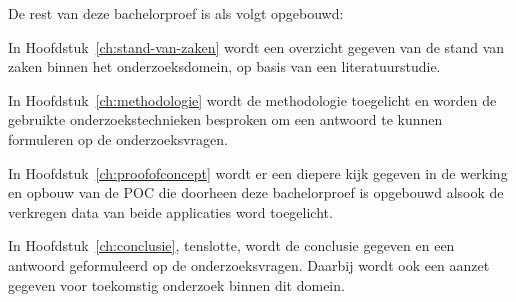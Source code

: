 
De rest van deze bachelorproef is als volgt opgebouwd:

In Hoofdstuk~\ref{ch:stand-van-zaken} wordt een overzicht gegeven van de stand van zaken binnen het onderzoeksdomein, op basis van een literatuurstudie.

In Hoofdstuk~\ref{ch:methodologie} wordt de methodologie toegelicht en worden de gebruikte onderzoekstechnieken besproken om een antwoord te kunnen formuleren op de onderzoeksvragen.

In Hoofdstuk~\ref{ch:proofofconcept} wordt er een diepere kijk gegeven in de werking en opbouw van de POC die doorheen deze bachelorproef is opgebouwd alsook de verkregen data van beide applicaties word toegelicht.

In Hoofdstuk~\ref{ch:conclusie}, tenslotte, wordt de conclusie gegeven en een antwoord geformuleerd op de onderzoeksvragen. Daarbij wordt ook een aanzet gegeven voor toekomstig onderzoek binnen dit domein.